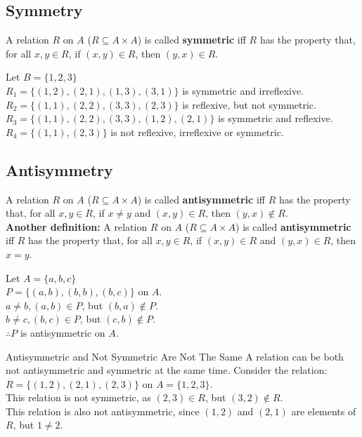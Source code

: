 \documentclass[../notes.tex]{subfiles}
\begin{document}
			\subsection{Symmetry}
				A relation $R$ on $A$ ($R \subseteq A \times A$) is called \textbf{symmetric} iff $R$ has the property that, for all $x, y \in R$, if $(x, y) \in R$, then $(y, x) \in R$.
				\begin{example}
					Let $B = \{1, 2, 3\}$\\
					$R_{1} = \bigl\{(1, 2), (2, 1), (1, 3), (3, 1)\bigr\}$ is symmetric and irreflexive.\\
					$R_{2} = \bigl\{(1, 1), (2, 2), (3, 3), (2, 3)\bigr\}$ is reflexive, but not symmetric.\\
					$R_{3} = \bigl\{(1, 1), (2, 2), (3, 3), (1, 2), (2, 1)\bigr\}$ is symmetric and reflexive.\\
					$R_{4} = \bigl\{(1, 1), (2, 3)\bigr\}$ is not reflexive, irreflexive or symmetric.
				\end{example}
				\pagebreak
			\subsection{Antisymmetry}
				A relation $R$ on $A$ ($R \subseteq A \times A$) is called \textbf{antisymmetric} iff $R$ has the property that, for all $x, y \in R$, if $x \neq y$ and $(x, y) \in R$, then $(y, x) \notin R$.\\
				\textbf{Another definition:} A relation $R$ on $A$ ($R \subseteq A \times A$) is called \textbf{antisymmetric} iff $R$ has the property that, for all $x, y \in R$, if $(x, y) \in R$ and $(y, x) \in R$, then $x = y$.
				\begin{example}
					Let $A = \{a, b, c\}$\\
					$P = \bigl\{(a, b), (b, b), (b, c)\bigr\}$ on $A$.\\
					$a \neq b, (a, b) \in P$, but $(b, a) \notin P$.\\
					$b \neq c, (b, c) \in P$, but $(c, b) \notin P$.\\
					$\therefore P$ is antisymmetric on $A$.
				\end{example}
				\begin{sidenote}{Antisymmetric and Not Symmetric Are Not The Same}
					A relation can be both not antisymmetric and symmetric at the same time. Consider the relation:\\
					$R = \{(1, 2), (2, 1), (2, 3)\}$ on $A = \{1, 2, 3\}$.\\
					This relation is not symmetric, as $(2, 3) \in R$, but $(3, 2) \notin R$.\\
					This relation is also not antisymmetric, since $(1, 2)$ and $(2, 1)$ are elements of $R$, but $1 \neq 2$.
				\end{sidenote}
\end{document}
